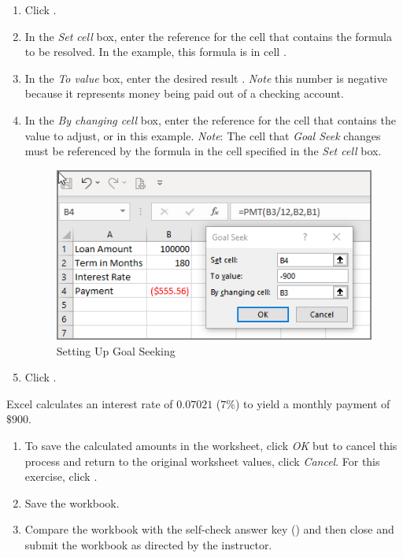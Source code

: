 \begin{enumbox}
	\begin{enumerate}
		\item Click .
		\item In the \textit{Set cell} box, enter the reference for the cell that contains the formula to be resolved. In the example, this formula is in cell .
		\item In the \textit{To value} box, enter the desired result . \textit{Note} this number is negative because it represents money being paid out of a checking account.
		\item In the \textit{By changing cell} box, enter the reference for the cell that contains the value to adjust, or  in this example. \textit{Note}: The cell that \textit{Goal Seek} changes must be referenced by the formula in the cell specified in the \textit{Set cell} box.	

		\begin{figure}[H]
			\centering
			\includegraphics[width=\maxwidth{.95\linewidth}]{gfx/ch08_fig60}
			\caption{Setting Up Goal Seeking}
			\label{08:fig60}
		\end{figure}
	
		\item Click .
	\end{enumerate}
\end{enumbox}

Excel calculates an interest rate of $ 0.07021 $ ($ 7\% $) to yield a monthly payment of $ \$900 $. 

\begin{enumbox}
	\begin{enumerate}
		\item To save the calculated amounts in the worksheet, click \textit{OK} but to cancel this process and return to the original worksheet values, click \textit{Cancel}. For this exercise, click .
		\item Save the  workbook.
		\item Compare the workbook with the self-check answer key () and then close and submit the  workbook as directed by the instructor.
	\end{enumerate}
\end{enumbox}
	
